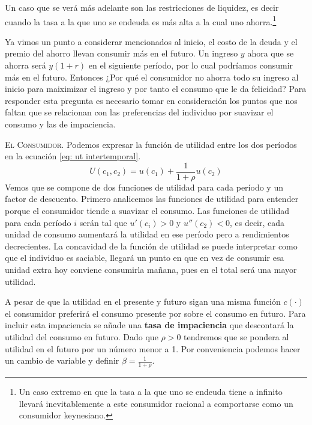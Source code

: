 
Un caso que se verá más adelante son las restricciones de liquidez, es decir cuando la tasa a la que uno se endeuda es más alta a la cual uno ahorra.\footnote{Un caso extremo en que la tasa a la que uno se endeuda tiene a infinito llevará inevitablemente a este consumidor racional a comportarse como un consumidor keynesiano.} 

Ya vimos un punto a considerar mencionados al inicio, el costo de la deuda y el premio del ahorro llevan consumir más en el futuro. Un ingreso $y$ ahora que se ahorra será $y(1+r)$ en el siguiente período, por lo cual podríamos consumir más en el futuro. Entonces ¿Por qué el consumidor no ahorra todo su ingreso al inicio para maiximizar el ingreso y por tanto el consumo que le da felicidad? Para responder esta pregunta es necesario tomar en consideración los puntos que nos faltan que se relacionan con las preferencias del individuo por suavizar el consumo y las de impaciencia. 

\textsc{El Consumidor}. Podemos expresar la función de utilidad entre los dos períodos en la ecuación \ref{eq: ut intertemporal}.
\begin{equation}
    U(c_1,c_2) = u(c_1) + \frac{1}{1+\rho} u(c_2) \label{eq: ut intertemporal}
\end{equation}
Vemos que se compone de dos funciones de utilidad para cada período y un factor de descuento. Primero analicemos las funciones de utilidad para entender porque el consumidor tiende a suavizar el consumo. Las funciones de utilidad para cada período $i$ serán tal que $u'(c_i)>0$ y $u''(c_2)<0$, es decir, cada unidad de consumo aumentará la utilidad en ese período pero a rendimientos decrecientes. La concavidad de la función de utilidad se puede interpretar como que el individuo es saciable, llegará un punto en que en vez de consumir esa unidad extra hoy conviene consumirla mañana, pues en el total será una mayor utilidad.

A pesar de que la utilidad en el presente y futuro sigan una misma función $c(\cdot)$ el consumidor preferirá el consumo presente por sobre el consumo en futuro. Para incluir esta impaciencia se añade una \textbf{tasa de impaciencia} que descontará la utilidad del consumo en futuro. Dado que $\rho>0$ tendremos que se pondera al utilidad en el futuro por un número menor a 1. Por conveniencia podemos hacer un cambio de variable y definir $\beta = \frac{1}{1+\rho}$. 

